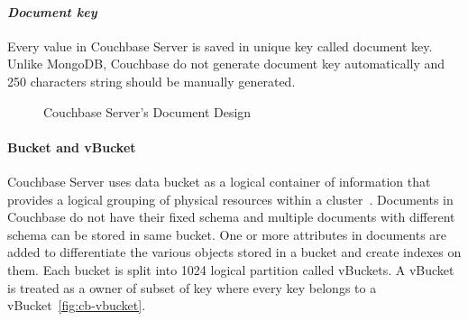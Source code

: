 \paragraph{\textit{Document key}}
Every value in Couchbase Server is saved in unique key called document key. Unlike MongoDB, Couchbase  do not generate document key automatically and 250 characters string should be manually generated.
\begin{figure}[h]
	\centering
	\centering
	\caption{Couchbase Server's Document Design ~\citep{couchbasedocs}}
	\label{fig:cb-views-document-design}	
\end{figure}

\paragraph{Bucket and vBucket}
Couchbase Server uses data bucket as a logical container of information that provides a logical grouping of physical resources within a cluster~\citep{lichtenberg2013nosql}. Documents in Couchbase do not have their fixed schema and multiple documents  with different schema can be stored in same bucket. One or more attributes in documents are added to differentiate the various objects stored in a bucket and create indexes on them. Each bucket is split into 1024 logical partition called vBuckets. A vBucket is treated as a owner of subset of key where every key belongs to a vBucket~\ref{fig:cb-vbucket}.  


